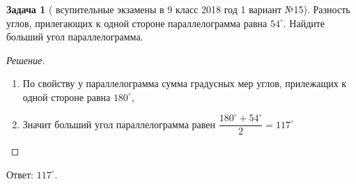 \documentclass[11 pt,russian]{article}
\theoremstyle{plain}
\theoremstyle{definition}
\newtheorem*{task*}{Задача}
\newcommand{\Answer}[1]{\vspace{-0.3cm}Ответ: #1.}
\begin{document}
\begin{task*}[ всупительные экзамены в 9 класс 2018 год 1 вариант №15]  Разность углов, прилегающих к одной стороне параллелограмма равна $54^{\circ}$. Найдите больший угол параллелограмма.\\
\end{task*}
\begin{figure}[h]
\end{figure}
\begin{proof}[Решение]\ 
\begin{enumerate}
\item  По свойству у параллелограмма сумма градусных мер углов, прилежащих к одной стороне равна $180^{\circ}$,

\item Значит больший угол параллелограмма равен $\dfrac{180^{\circ}+54^{\circ}}{2}=117^{\circ}$
\end{enumerate}
\end{proof}
\Answer{$117^{\circ}$}
\end{document}
